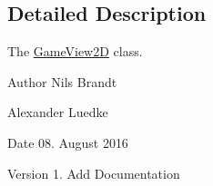 \subsection{Detailed Description}
The \hyperlink{classGameView2D}{Game\-View2\-D} class. 

\begin{DoxyAuthor}{Author}
Nils Brandt 

Alexander Luedke
\end{DoxyAuthor}
\begin{DoxyDate}{Date}
08. August 2016
\end{DoxyDate}
\begin{DoxyVersion}{Version}
1. Add Documentation 
\end{DoxyVersion}
